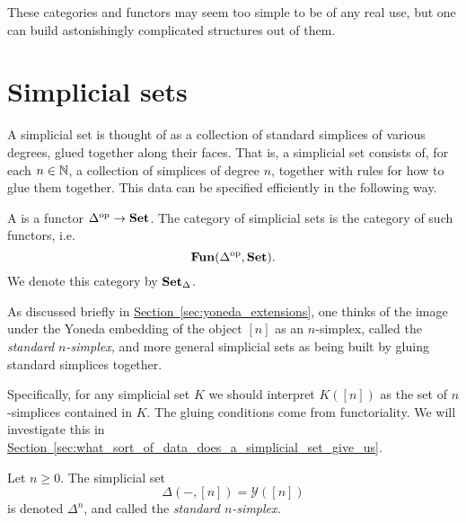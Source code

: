 \documentclass[main.tex]{subfiles}
\begin{document}
These categories and functors may seem too simple to be of any real use, but one can build astonishingly complicated structures out of them.

\section{Simplicial sets}
\label{sec:simplicial_sets}

A simplicial set is thought of as a collection of standard simplices of various degrees, glued together along their faces. That is, a simplicial set consists of, for each $n \in \mathbb{N}$, a collection of simplices of degree $n$, together with rules for how to glue them together. This data can be specified efficiently in the following way.

\begin{definition}
  \label{def:simplicial_set}
  A  is a functor $\Delta^{\mathrm{op}} \to \mathbf{Set}$. The category of simplicial sets is the category of such functors, i.e.\
  \begin{equation*}
    \mathbf{Fun}(\Delta^{\mathrm{op}}, \mathbf{Set}).
  \end{equation*}
  We denote this category by $\operatorname{\mathbf{Set}_{\Delta}}$.
\end{definition}

As discussed briefly in \hyperref[sec:yoneda_extensions]{Section~\ref*{sec:yoneda_extensions}}, one thinks of the image under the Yoneda embedding of the object $[n]$ as an $n$-simplex, called the \emph{standard $n$-simplex,} and more general simplicial sets as being built by gluing standard simplices together.

Specifically, for any simplicial set $K$ we should interpret $K([n])$ as the set of $n$-simplices contained in $K$. The gluing conditions come from functoriality. We will investigate this in \hyperref[sec:what_sort_of_data_does_a_simplicial_set_give_us]{Section~\ref*{sec:what_sort_of_data_does_a_simplicial_set_give_us}}.

\begin{definition}
  \label{eg:standard_simplex}
  Let $n \geq 0$. The simplicial set
  \begin{equation*}
    \Delta(-, [n]) = \mathcal{Y}([n])
  \end{equation*}
  is denoted $\Delta^{n}$, and called the \emph{standard $n$-simplex.}
\end{definition}
\end{document}

